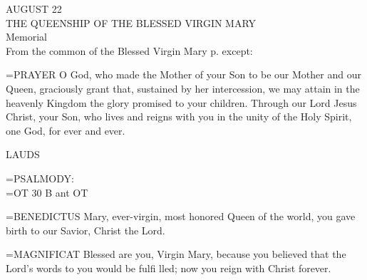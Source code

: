 \begin{center}\normalsize AUGUST 22\\
\footnotesize THE QUEENSHIP OF THE BLESSED VIRGIN MARY\\
\footnotesize Memorial\\
\footnotesize From the common of the Blessed Virgin Mary p.     except:\\
\end{center}

\hangindent=\parindent \small{PRAYER 
O God, who made the Mother of your Son
to be our Mother and our Queen,
graciously grant that, sustained by her intercession,
we may attain in the heavenly Kingdom
the glory promised to your children.
Through our Lord Jesus Christ, your Son,
who lives and reigns with you in the unity of the Holy Spirit,
one God, for ever and ever.\\}
 
\begin{flushleft}\normalsize LAUDS\\\end{flushleft}

\hangindent=\parindent \small{PSALMODY:}\\
\hangindent=\parindent  OT 30 B ant OT\vspace{0.5em}

\hangindent=\parindent \small{BENEDICTUS  Mary, ever-virgin, most honored Queen of the world,
you gave birth to our Savior, Christ the Lord.\\}
 
\hangindent=\parindent \small{MAGNIFICAT  Blessed are you, Virgin Mary, because you believed that
the Lord’s words to you would be fulfi lled; now you reign with Christ
forever.\\}
 
